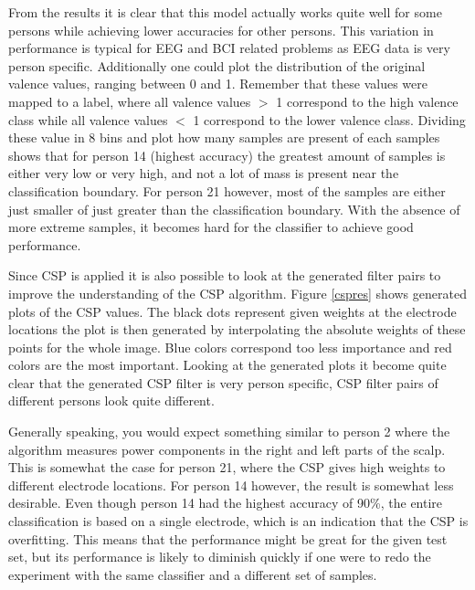 From the results it is clear that this model actually works quite well for some persons while achieving lower accuracies for other persons. This variation in performance is typical for EEG and BCI related problems as EEG data is very person specific. Additionally one could plot the distribution of the original valence values, ranging between 0 and 1. Remember that these values were mapped to a label, where all valence values $>$ 1 correspond to the high valence class while all valence values $<$ 1 correspond to the lower valence class. Dividing these value in 8 bins and plot how many samples are present of each samples shows that for person 14 (highest accuracy) the greatest amount of samples is either very low or very high, and not a lot of mass is present near the classification boundary. For person 21 however, most of the samples are either just smaller of just greater than the classification boundary. With the absence of more extreme samples, it becomes hard for the classifier to achieve good performance.


Since CSP is applied it is also possible to look at the generated filter pairs to improve the understanding of the CSP algorithm. Figure \ref{cspres} shows generated plots of the CSP values. The black dots represent given weights at the electrode locations the plot is then generated by interpolating the absolute weights of these points for the whole image. Blue colors correspond too less importance and red colors are the most important. Looking at the generated plots it become quite clear that the generated CSP filter is very person specific, CSP filter pairs of different persons look quite different. 

\npar

Generally speaking, you would expect something similar to person 2 where the algorithm measures power components in the right and left parts of the scalp. This is somewhat the case for person 21, where the CSP gives high weights to different electrode locations. For person 14 however, the result is somewhat less desirable. Even though person 14 had the highest accuracy of 90\%, the entire classification is based on a single electrode, which is an indication that the CSP is overfitting. This means that the performance might be great for the given test set, but its performance is likely to diminish quickly if one were to redo the experiment with the same classifier and a different set of samples. 

